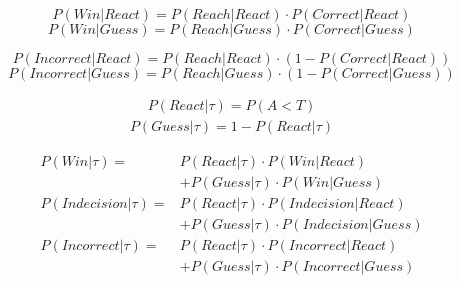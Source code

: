 \documentclass[12pt,letterpaper]{article}
\begin{document}
\begin{equation}
    P(Win|React) = P(Reach|React) \cdot P(Correct|React)
\end{equation}
\begin{equation}
    P(Win|Guess) = P(Reach|Guess) \cdot P(Correct|Guess)
\end{equation}


\begin{equation}
    P(Incorrect|React) = P(Reach|React) \cdot (1 - P(Correct|React))
\end{equation}
\begin{equation}
    P(Incorrect|Guess) = P(Reach|Guess) \cdot (1 - P(Correct|Guess))
\end{equation}







\begin{align}
    P(React|\tau) = P(A<T)
\end{align}
\begin{align}
    P(Guess|\tau) = 1 - P(React|\tau)
\end{align}


\begin{align}
    P(Win|\tau)        =& P(React|\tau) \cdot P(Win|React) \nonumber \\ &+  P(Guess|\tau) \cdot P(Win|Guess)\\
    P(Indecision|\tau) =& P(React|\tau) \cdot P(Indecision|React) \nonumber \\ &+ P(Guess|\tau) \cdot P(Indecision|Guess) \\
    P(Incorrect|\tau)  =& P(React|\tau) \cdot P(Incorrect|React) \nonumber \\ &+ P(Guess|\tau) \cdot P(Incorrect|Guess)
\end{align}
\end{document}
